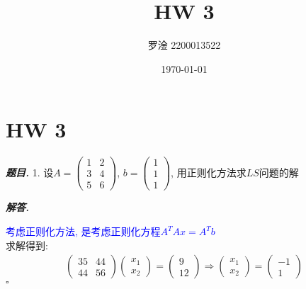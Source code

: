 \documentclass[10pt, a4paper, oneside]{ctexart}
\title{\textbf{HW 3}}
\author{罗淦  2200013522}
\date{\today}
\newenvironment{problem}{\begin{framed}\par\noindent\textbf{\textit{题目. }}}{\end{framed}\par}
\newenvironment{solution}{%
  \par\noindent\textbf{\textit{解答. }}\ignorespaces
}{%
  \hfill\ensuremath{\square}\par %
}
\begin{document}
\maketitle


\section{HW 3}

\begin{problem}
    1. 设$A=\begin{pmatrix}
            1&2\\3&4\\5&6
        \end{pmatrix}$, $b=\begin{pmatrix}
            1\\1\\1
        \end{pmatrix}$, 用正则化方法求$LS$问题的解
    \end{problem}
    \begin{solution}
    \textcolor{blue}{考虑正则化方法, 是考虑正则化方程$A^TAx=A^Tb$}\\
    求解得到:
    \begin{align*}
        \begin{pmatrix}
            35&44\\44&56
        \end{pmatrix}\begin{pmatrix}
            x_1\\x_2
        \end{pmatrix}=\begin{pmatrix}
            9\\12
        \end{pmatrix}\Rightarrow
        \begin{pmatrix}
            x_1\\x_2
        \end{pmatrix}=\begin{pmatrix}
            -1\\1
        \end{pmatrix}
    \end{align*}
    \end{solution}
    
\end{document}
